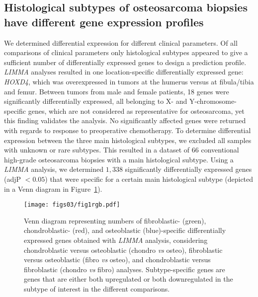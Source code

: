 \subsection{Histological subtypes of osteosarcoma biopsies have different gene expression profiles}
We determined differential expression for different clinical
parameters. Of all comparisons of clinical parameters
only histological subtypes appeared to give a sufficient
number of differentially expressed genes to design a prediction
profile. {\it LIMMA} analyses resulted in one location\hyp{}specific differentially expressed gene: {\it HOXD4},
which was overexpressed in tumors at the humerus versus
at fibula/tibia and femur. Between tumors from
male and female patients, 18 genes were significantly
differentially expressed, all belonging to X- and Y\hyp{}chromosome\hyp{}specific genes, which are not considered as
representative for osteosarcoma, yet this finding validates
the analysis. No significantly affected genes were
returned with regards to response to preoperative chemotherapy.
To determine differential expression
between the three main histological subtypes, we
excluded all samples with unknown or rare subtypes.
This resulted in a dataset of 66 conventional high\hyp{}grade
osteosarcoma biopsies with a main histological subtype.
Using a {\it LIMMA} analysis, we determined $1,338$
significantly differentially expressed genes (adjP $<0.05$)
that were specific for a certain main histological subtype
(depicted in a Venn diagram in Figure~\ref{fig3.1}).%
%
\begin{figure}[htbp]
  \centering
  \begin{minipage}[b]{0.50\linewidth}
   \texttt{[image: figs03/fig1rgb.pdf]}	%
  \end{minipage}
    \hfill
  \begin{minipage}[b]{0.46\linewidth}
    \caption{Venn diagram representing numbers of fibroblastic- (green), chondroblastic- (red), and osteoblastic (blue)\hyp{}specific differentially expressed genes obtained with {\it LIMMA} analysis, considering chondroblastic versus osteoblastic (chondro {\it vs} osteo), fibroblastic versus osteoblastic (fibro {\it vs} osteo), and chondroblastic versus fibroblastic (chondro {\it vs} fibro) analyses. Subtype\hyp{}specific genes are genes that are either both upregulated or both downregulated in the subtype of interest in the different comparisons.}
     \label{fig3.1}
     \end{minipage}
\end{figure}
